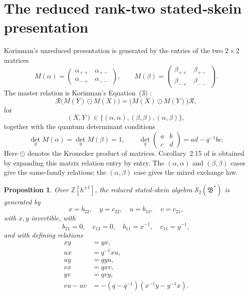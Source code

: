 \documentclass[12pt]{article}
\theoremstyle{plain}
\newtheorem{proposition}[theorem]{Proposition}
\theoremstyle{definition}
\numberwithin{equation}{section}
\newcommand{\Ring}{\mathbb{Z}[h^{\pm 1}]}
\newcommand{\bigon}{\mathfrak{B}^{*}}
\newcommand{\hS}{\overline{\mathscr{S}}}
\begin{document}
\section{The reduced rank‑two stated‑skein presentation}
\label{sec:reduced-skein}

Korinman's unreduced presentation is generated by the entries of the two \(2\times 2\) matrices
\[
M(\alpha)=
\begin{pmatrix}
\alpha_{++} & \alpha_{+-}\\
\alpha_{-+} & \alpha_{--}
\end{pmatrix},
\qquad
M(\beta)=
\begin{pmatrix}
\beta_{++} & \beta_{+-}\\
\beta_{-+} & \beta_{--}
\end{pmatrix}.
\]
The master relation is Korinman's Equation~(3) \cite{Korinman}:
\[
\mathscr R\bigl(M(Y)\odot M(X)\bigr)
=
\bigl(M(X)\odot M(Y)\bigr)\mathscr R,
\]
for
\[
(X,Y)\in\{(\alpha,\alpha),(\beta,\beta),(\alpha,\beta)\},
\]
together with the quantum determinant conditions
\[
\det_q M(\alpha)=\det_q M(\beta)=1,
\qquad
\det_q
\begin{pmatrix}
a&b\\ c&d
\end{pmatrix}
=
ad-q^{-1}bc.
\]
Here \(\odot\) denotes the Kronecker product of matrices.  Corollary~2.15 of \cite{Korinman} is obtained by expanding this matrix relation entry by entry.  The \((\alpha,\alpha)\) and \((\beta,\beta)\) cases give the same-family relations; the \((\alpha,\beta)\) case gives the mixed exchange law.

\begin{proposition}\label{prop:reduced-presentation}
Over \(\Ring\), the reduced stated-skein algebra \(\hS_2(\bigon)\) is generated by
\[
x=b_{22},\quad y=c_{22},\quad u=b_{12},\quad v=c_{21},
\]
with \(x,y\) invertible, with
\[
b_{21}=0,\quad c_{12}=0,\quad b_{11}=x^{-1},\quad c_{11}=y^{-1},
\]
and with defining relations
\begin{align}
xy&=yx, \label{eq:xy-comm}\\
u x&=q^{-1}x u, \label{eq:ux}\\
u y&=q y u, \label{eq:uy}\\
v x&=q x v, \label{eq:vx}\\
y v&=q v y, \label{eq:yv}\\
v u-u v&=-(q-q^{-1})(x^{-1}y-y^{-1}x). \label{eq:vu-uv}
\end{align}
\end{proposition}
\end{document}
